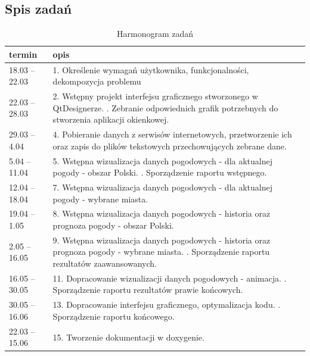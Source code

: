 \documentclass[10pt, a4paper]{article}
\begin{document}
\subsection{Spis zadań}
\begin{table}[!h]
	\centering
	\caption{Harmonogram zadań}
	\label{table_exres}
	\begin{tabular}{p{20mm}p{120mm}}
		\toprule
		termin & opis\\ \midrule
		18.03 -- 22.03 & 1. Określenie wymagań użytkownika, funkcjonalności, dekompozycja problemu  \\
		\midrule
		22.03 -- 28.03 & 2. Wstępny projekt interfejsu graficznego stworzonego w QtDesignerze. \newline 3. Zebranie odpowiednich grafik potrzebnych do stworzenia aplikacji okienkowej.\\
		\midrule
	    29.03 -- 4.04 & 4. Pobieranie danych z serwisów internetowych, przetworzenie ich oraz zapis do plików tekstowych przechowujących zebrane dane. \\
		\midrule
		 5.04 -- 11.04 & 5. Wstępna wizualizacja danych pogodowych - dla aktualnej pogody - obszar Polski. \newline 6. Sporządzenie raportu wstępnego.\\
		 \midrule
        12.04 -- 18.04 &  7. Wstępna wizualizacja danych pogodowych - dla aktualnej pogody - wybrane miasta.\\

		\midrule
        19.04 -- 1.05 & 8. Wstępna wizualizacja danych pogodowych - historia oraz prognoza pogody - obszar Polski. \\ 

		\midrule
        2.05 -- 16.05 & 9. Wstępna wizualizacja danych pogodowych - historia oraz prognoza pogody - wybrane miasta. \newline 10. Sporządzenie raportu rezultatów zaawansowanych. \\

		\midrule
        16.05 -- 30.05 & 11. Dopracowanie wizualizacji danych pogodowych - animacja. \newline 12. Sporządzenie raportu rezultatów prawie końcowych. \\
        
        \midrule 
        30.05 -- 16.06 & 13. Dopracowanie interfejsu graficznego, optymalizacja kodu. 
        \newline 14. Sporządzenie raportu końcowego. \\
        \midrule
        22.03 -- 15.06 & 15. Tworzenie dokumentacji w doxygenie. \\

		\bottomrule
	\end{tabular}
\end{table}
\end{document}
